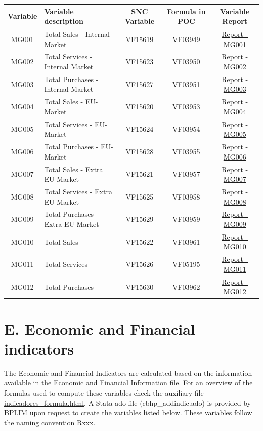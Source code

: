 \documentclass[]{book}
\begin{document}
\begin{longtable}[]{@{}clccc@{}}
\toprule
Variable & Variable description & SNC Variable & Formula in POC & Variable Report\tabularnewline
\midrule
\endhead
MG001 & Total Sales - Internal Market & VF15619 & VF03949 & \href{./Auxiliary\%20Files/technical_reports/variable_report/MG001(!).pdf}{Report - MG001}\tabularnewline
MG002 & Total Services - Internal Market & VF15623 & VF03950 & \href{./Auxiliary\%20Files/technical_reports/variable_report/MG002(!).pdf}{Report - MG002}\tabularnewline
MG003 & Total Purchases - Internal Market & VF15627 & VF03951 & \href{./Auxiliary\%20Files/technical_reports/variable_report/MG003.pdf}{Report - MG003}\tabularnewline
MG004 & Total Sales - EU-Market & VF15620 & VF03953 & \href{./Auxiliary\%20Files/technical_reports/variable_report/MG004(!).pdf}{Report - MG004}\tabularnewline
MG005 & Total Services - EU-Market & VF15624 & VF03954 & \href{./Auxiliary\%20Files/technical_reports/variable_report/MG005.pdf}{Report - MG005}\tabularnewline
MG006 & Total Purchases - EU-Market & VF15628 & VF03955 & \href{./Auxiliary\%20Files/technical_reports/variable_report/MG006.pdf}{Report - MG006}\tabularnewline
MG007 & Total Sales - Extra EU-Market & VF15621 & VF03957 & \href{./Auxiliary\%20Files/technical_reports/variable_report/MG007(!).pdf}{Report - MG007}\tabularnewline
MG008 & Total Services - Extra EU-Market & VF15625 & VF03958 & \href{./Auxiliary\%20Files/technical_reports/variable_report/MG008(!).pdf}{Report - MG008}\tabularnewline
MG009 & Total Purchases - Extra EU-Market & VF15629 & VF03959 & \href{./Auxiliary\%20Files/technical_reports/variable_report/MG009.pdf}{Report - MG009}\tabularnewline
MG010 & Total Sales & VF15622 & VF03961 & \href{./Auxiliary\%20Files/technical_reports/variable_report/MG010.pdf}{Report - MG010}\tabularnewline
MG011 & Total Services & VF15626 & VF05195 & \href{./Auxiliary\%20Files/technical_reports/variable_report/MG011.pdf}{Report - MG011}\tabularnewline
MG012 & Total Purchases & VF15630 & VF03962 & \href{./Auxiliary\%20Files/technical_reports/variable_report/MG012.pdf}{Report - MG012}\tabularnewline
\bottomrule
\end{longtable}

\hypertarget{e.-economic-and-financial-indicators}{%
\section{E. Economic and Financial indicators}\label{e.-economic-and-financial-indicators}}

The Economic and Financial Indicators are calculated based on the information available in the Economic and Financial Information file. For an overview of the formulas used to compute these variables check the auxiliary file \href{./Auxiliary\%20Files/variables_description/indicadores_formula.html}{indicadores\_formula.html}.
A Stata ado file (cbhp\_addindic.ado) is provided by BPLIM upon request to create the variables listed below. These variables follow the naming convention Rxxx.
\end{document}
